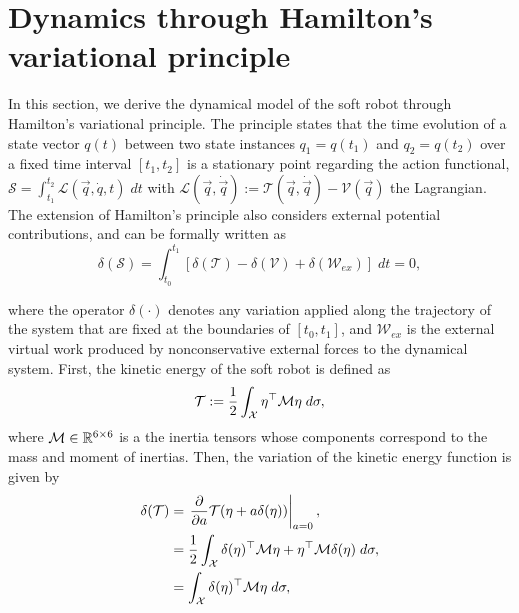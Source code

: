 \newpage
\section{Dynamics through Hamilton's variational principle}
In this section, we derive the dynamical model of the soft robot through Hamilton's variational principle. The principle states that the time evolution of a state vector $q(t)$ between two state instances $q_1 = q(t_1)$ and $q_2 = q(t_2)$ over a fixed time interval $[t_1,t_2]$ is a stationary point regarding the action functional, $\mathcal{S} = \int_{t_1}^{t_2} \mathcal{L}(\vec{q},\dot{q},t) \; dt$ with $\mathcal{L}(\vec{q},\dot{\vec{q}}) := \mathcal{T}(\vec{q},\dot{\vec{q}}) - \mathcal{V}(\vec{q})$ the Lagrangian. The extension of Hamilton's principle \cite{Boyer2010} also considers external potential contributions, and can be formally written as
\begin{equation}
\delta(\mathcal{S}) = \int_{t_0}^{t_1} \left[\delta(\mathcal{T}) - \delta(\mathcal{V}) + \delta(\mathcal{W}_{ex}) \right]\; dt = 0,
\end{equation}

\noindent where the operator $\delta(\cdot)$ denotes any variation applied along the trajectory of the system that are fixed at the boundaries of $[t_0,t_1]$, and $\mathcal{W}_{ex}$ is the external virtual work produced by nonconservative external forces to the dynamical system. First, the kinetic energy of the soft robot is defined as 
\begin{equation}
\mathcal{T} := \frac{1}{2}\int_{\mathcal{X}} {\eta}^\top \mathcal{M} {\eta}\;d\sigma, \label{eq:c2_Tfunc} 
\end{equation}
\noindent where $\mathcal{M} \in \mathbb{R}^{6\times6}$ is a the inertia tensors whose components correspond to the mass and moment of inertias. Then, the variation of the kinetic energy function is given by
\begin{align}
\delta(\mathcal{T}) & = \left. \frac{\partial }{\partial a} \mathcal{T}({\eta} + a \delta({\eta})) \right|_{a = 0}, \notag \\
& = \frac{1}{2} \int_{\mathcal{X}} \delta({\eta})^\top \mathcal{M} {\eta} + {\eta}^\top \mathcal{M} \delta({\eta}) \; d\sigma, \notag \\
& = \int_{\mathcal{X}} \delta({\eta})^\top \mathcal{M} {\eta} \; d\sigma, \label{eq:c2_varham_T}
\end{align}

